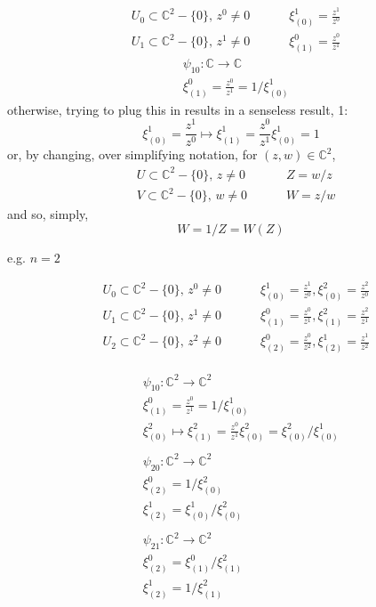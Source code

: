 \documentclass[twoside]{amsart}
\begin{document}
\[
\begin{aligned}
& U_0 \subset \mathbb{C}^2 - \lbrace 0 \rbrace , \, z^0 \neq 0 \, \qquad \,  & \xi^1_{(0)} = \frac{z^1}{z^0} \\ 
  & U_1 \subset \mathbb{C}^2 - \lbrace 0 \rbrace , \, z^1 \neq 0 \, \qquad \,  & \xi^0_{(1)} = \frac{z^0}{z^1}   
\end{aligned}
\]
\[
\begin{aligned}
& \psi_{10} : \mathbb{C} \to \mathbb{C} \\
& \xi_{(1)}^0 = \frac{z^0}{z^1} = 1/\xi^1_{(0)}
  \end{aligned}
\]
otherwise, trying to plug this in results in a senseless result, 1:
\[
 \xi_{(0)}^1 = \frac{z^1}{z^0} \mapsto \xi^1_{(1)} = \frac{z^0}{z^1} \xi^1_{ (0)} = 1 
\]
or, by changing, over simplifying notation, for $(z,w) \in \mathbb{C}^2$,
\[
\begin{aligned}
& U \subset \mathbb{C}^2 - \lbrace 0 \rbrace , \, z \neq 0 \, \qquad \,  & Z = w/z  \\ 
  & V \subset \mathbb{C}^2 - \lbrace 0 \rbrace , \, w \neq 0 \, \qquad \,  & W = z/w    
\end{aligned}
\]
and so, simply,
\[
W = 1/Z = W(Z)
\]

e.g. $n=2$  

\[
\begin{aligned}
& U_0 \subset \mathbb{C}^2 - \lbrace 0 \rbrace , \, z^0 \neq 0 \, \qquad \,  & \xi^1_{(0)} = \frac{z^1}{z^0},  \xi^2_{(0)} = \frac{z^2}{z^0}  \\ 
  & U_1 \subset \mathbb{C}^2 - \lbrace 0 \rbrace , \, z^1 \neq 0 \, \qquad \,  & \xi^0_{(1)} = \frac{z^0}{z^1} , \xi^2_{(1)} = \frac{z^2}{z^1}   \\
  & U_2 \subset \mathbb{C}^2 - \lbrace 0 \rbrace , \, z^2 \neq 0 \, \qquad \,  & \xi^0_{(2)} = \frac{z^0}{z^2} , \xi^1_{(2)} = \frac{z^1}{z^2}  
\end{aligned}
\]

\[
\begin{aligned}
& \begin{aligned}
& \psi_{10} : \mathbb{C}^2 \to \mathbb{C}^2 \\
    & \xi_{(1)}^0 = \frac{z^0}{z^1} = 1/\xi^1_{(0)} \\
    & \xi_{(0)}^2 \mapsto \xi_{(1)}^2 = \frac{z^0}{z^1} \xi^2_{(0)} = \xi^2_{(0)} / \xi^1_{(0)} 
  \end{aligned} \\
  &  \begin{aligned}
& \psi_{20} : \mathbb{C}^2 \to \mathbb{C}^2 \\
       & \xi^0_{(2)} = 1/ \xi^2_{(0)} \\
       & \xi^1_{(2)} =  \xi^1_{(0)} / \xi^2_{(0)} 
     \end{aligned} \\
    &  \begin{aligned}
& \psi_{21} : \mathbb{C}^2 \to \mathbb{C}^2 \\
       & \xi^0_{(2)} = \xi^0_{(1)} / \xi^2_{(1)}  \\ 
       & \xi^1_{(2)} =  1/ \xi^2_{(1)} \\
       \end{aligned} 
\end{aligned}
\]
\end{document}

